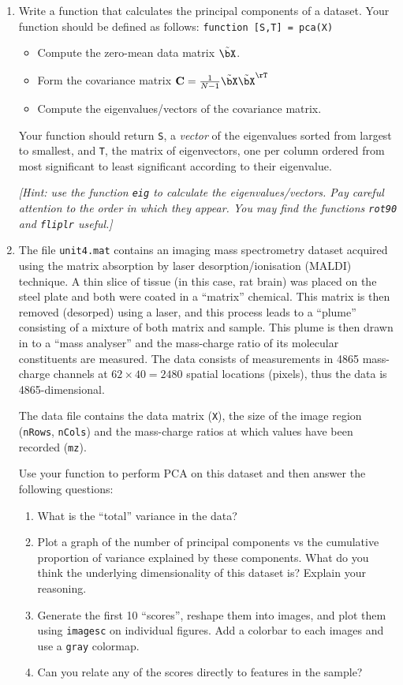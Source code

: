 \documentclass[12pt,a4paper]{tufte-handout}
\begin{document}
\begin{enumerate}
  \item Write a function that calculates the principal components of a dataset. Your function should be defined as follows:
    \texttt{function [S,T] = pca(X)}
    \begin{itemize}
      \item Compute the zero-mean data matrix $\tilde\bX$.
      \item Form the covariance matrix $\mathbf{C}=\frac{1}{N-1}\tilde\bX\tilde\bX^\rT$
      \item Compute the eigenvalues/vectors of the covariance matrix.
    \end{itemize}
    Your function should return \texttt{S}, a \textit{vector} of the eigenvalues sorted from largest to smallest, and \texttt{T}, the matrix of eigenvectors, one per column ordered from most significant to least significant according to their eigenvalue.

    \textit{[Hint: use the function \texttt{eig} to calculate the eigenvalues/vectors. Pay careful attention to the order in which they appear. You may find the functions \texttt{rot90} and \texttt{fliplr} useful.]}

    \item  The file \texttt{unit4.mat} contains an imaging mass spectrometry dataset acquired using the matrix absorption by laser desorption/ionisation (MALDI) technique. A thin slice of tissue (in this case, rat brain) was placed on the steel plate and both were coated in a ``matrix'' chemical. This matrix is then removed (desorped) using a laser, and this process leads to a ``plume'' consisting of a mixture of both matrix and sample. This plume is then drawn in to a ``mass analyser'' and the mass-charge ratio of its molecular constituents are measured. The data consists of measurements in 4865 mass-charge channels at $62\times 40 = 2480$ spatial locations (pixels), thus the data is 4865-dimensional. 

The data file contains the data matrix (\texttt{X}), the size of the image region (\texttt{nRows}, \texttt{nCols}) and the mass-charge ratios at which values have been recorded (\texttt{mz}).

Use your function to perform PCA on this dataset and then answer the following questions:

\begin{enumerate}
  \item What is the ``total'' variance in the data?
  \item Plot a graph of the number of principal components vs the cumulative proportion of variance explained by these components. What do you think the underlying dimensionality of this dataset is? Explain your reasoning.
  \item Generate the first 10 ``scores'', reshape them into images, and plot them using \texttt{imagesc} on individual figures. Add a colorbar to each images and use a \texttt{gray} colormap. 
  \item Can you relate any of the scores directly to features in the sample?
\end{enumerate}
      


\end{enumerate}
\end{document}
